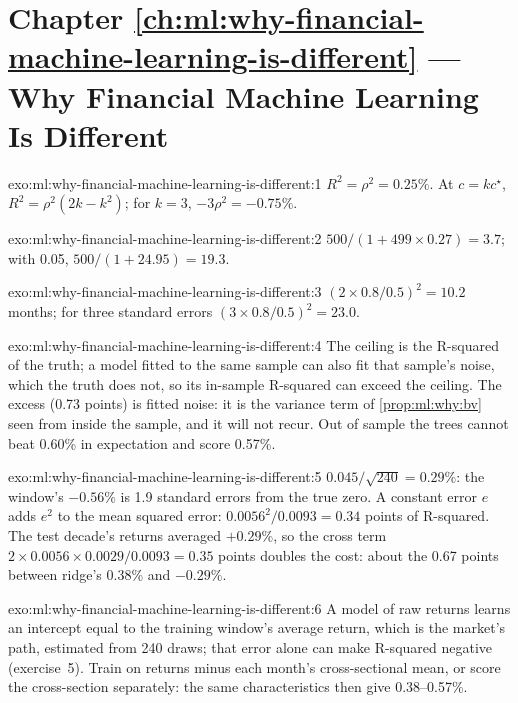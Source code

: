 \section*{Chapter \ref{ch:ml:why-financial-machine-learning-is-different} --- Why Financial Machine Learning Is Different}

\begin{solution}{exo:ml:why-financial-machine-learning-is-different:1}
$R^2 = \rho^2 = 0.25\%$. At $c = kc^\star$, $R^2 = \rho^2(2k - k^2)$; for $k = 3$, $-3\rho^2 = -0.75\%$.
\end{solution}

\begin{solution}{exo:ml:why-financial-machine-learning-is-different:2}
$500/(1 + 499\times0.27) = 3.7$; with 0.05, $500/(1 + 24.95) = 19.3$.
\end{solution}

\begin{solution}{exo:ml:why-financial-machine-learning-is-different:3}
$(2\times0.8/0.5)^2 = 10.2$ months; for three standard errors $(3\times0.8/0.5)^2 = 23.0$.
\end{solution}

\begin{solution}{exo:ml:why-financial-machine-learning-is-different:4}
The ceiling is the R-squared of the truth; a model fitted to the same sample can also fit that sample's noise, which
the truth does not, so its in-sample R-squared can exceed the ceiling. The excess (0.73 points) is fitted noise: it is
the variance term of \cref{prop:ml:why:bv} seen from inside the sample, and it will not recur. Out of sample the trees
cannot beat 0.60\% in expectation and score 0.57\%.
\end{solution}

\begin{solution}{exo:ml:why-financial-machine-learning-is-different:5}
$0.045/\sqrt{240} = 0.29\%$: the window's $-0.56\%$ is 1.9 standard errors from the true zero. A constant error $e$ adds
$e^2$ to the mean squared error: $0.0056^2/0.0093 = 0.34$ points of R-squared. The test decade's returns averaged
$+0.29\%$, so the cross term $2\times0.0056\times0.0029/0.0093 = 0.35$ points doubles the cost: about the 0.67 points
between ridge's 0.38\% and $-0.29\%$.
\end{solution}

\begin{solution}{exo:ml:why-financial-machine-learning-is-different:6}
A model of raw returns learns an intercept equal to the training window's average return, which is the market's path,
estimated from 240 draws; that error alone can make R-squared negative (exercise~5). Train on returns minus each month's
cross-sectional mean, or score the cross-section separately: the same characteristics then give 0.38--0.57\%.
\end{solution}

